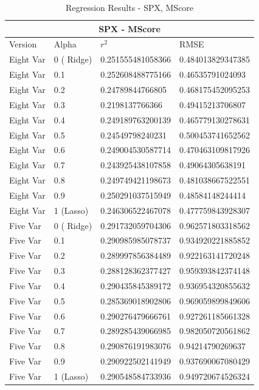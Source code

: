 \begin{table}[h!]
\centering
\begin{tabular}{ |p{2.5cm}||p{2.5cm}||p{4cm}|p{4cm}| }
 \hline
 \multicolumn{4}{|c|}{SPX - MScore} \\
 \hline
 Version & Alpha & $r^2$ & RMSE \\
 \hline
Eight Var&0 ( Ridge)&0.251555481058366&0.484013829347385 \\
\rowcolor{gray}Eight Var&0.1&0.252608488775166&0.46535791024093 \\
Eight Var&0.2&0.24789844766805&0.468175452095253 \\
Eight Var&0.3&0.2198137766366&0.49415213706807 \\
Eight Var&0.4&0.249189763200139&0.465779130278631 \\
Eight Var&0.5&0.24549798240231&0.500453741652562 \\
Eight Var&0.6&0.249004530587714&0.470463109817926 \\
Eight Var&0.7&0.243925438107858&0.49064305638191 \\
Eight Var&0.8&0.249749421198673&0.481038667522551 \\
Eight Var&0.9&0.250291037515949&0.48584148244414 \\
Eight Var&1 (Lasso)&0.246306522467078&0.477759843928307 \\
 \hline
\rowcolor{gray}Five Var&0 ( Ridge)&0.291732059704306&0.962571803318562 \\
Five Var&0.1&0.290985985078737&0.934920221885852 \\
Five Var&0.2&0.289997856384489&0.922163141720248 \\
Five Var&0.3&0.288128362377427&0.959393842374148 \\
Five Var&0.4&0.290435845389172&0.936954320855632 \\
Five Var&0.5&0.285369018902806&0.969059899849606 \\
Five Var&0.6&0.290276479666761&0.927261185661328 \\
Five Var&0.7&0.289285439066985&0.982050720561862 \\
Five Var&0.8&0.290876191983076&0.94214790269637 \\
Five Var&0.9&0.290922502141949&0.937690067080429 \\
Five Var&1 (Lasso)&0.290548584733936&0.949720674526324 \\
 \hline
\end{tabular}
\caption{Regression Results  - SPX, MScore}
\end{table}
\clearpage

